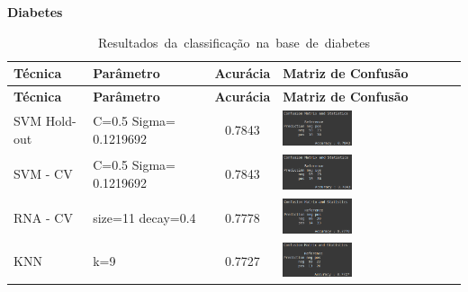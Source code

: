 \newpage
\begin{center}
    \textbf{Diabetes}
\end{center}


\begin{longtable}{|>{\centering\arraybackslash}p{3cm}|>{\centering\arraybackslash}m{2.5cm}|c|m{7cm}|}
\caption{\mbox{Resultados da classificação na base de diabetes}} \\
\hline
\textbf{Técnica} & \textbf{Parâmetro} & \textbf{Acurácia} & \textbf{Matriz de Confusão} \\
\hline
\endfirsthead

\hline
\textbf{Técnica} & \textbf{Parâmetro} & \textbf{Acurácia} & \textbf{Matriz de Confusão} \\
\hline
\endhead

\hline
\colorbox[HTML]{CAF2C2}{SVM Hold-out} & C=0.5 Sigma= 0.1219692 & \colorbox[HTML]{CAF2C2}{0.7843} & \includegraphics[width=0.4\textwidth]{apendices/fig/8_IAA008_8.png} \\
\hline
\colorbox[HTML]{CAF2C2}{SVM - CV} & C=0.5 Sigma= 0.1219692 & \colorbox[HTML]{CAF2C2}{0.7843} & \includegraphics[width=0.4\textwidth]{apendices/fig/8_IAA008_9.png} \\
\hline
RNA - CV & size=11 decay=0.4 & 0.7778 & \includegraphics[width=0.4\textwidth]{apendices/fig/8_IAA008_10.png} \\
\hline
KNN & k=9 & 0.7727 & \includegraphics[width=0.4\textwidth]{apendices/fig/8_IAA008_11.png} \\

\end{longtable}
